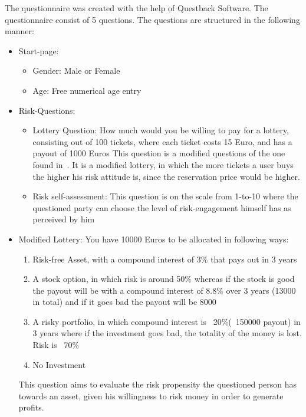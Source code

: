 \documentclass[12pt]{article}
\begin{document}
The questionnaire was created with the help of Questback Software. The questionnaire consist of 5 questions. The questions are structured in the following manner:
\begin{itemize}
    \item Start-page:
        \begin{itemize}
            \item Gender: Male or Female
            \item Age: Free numerical age entry
        \end{itemize}
    \item Risk-Questions:
        \begin{itemize}
            \item Lottery Question: How much would you be willing to pay for a lottery, consisting out of 100 tickets, where each ticket costs 15 Euro, and has a payout of 1000 Euros
                This question is a modified questions of the one found in~\cite{10.1.1.558.6537.pdf}. It is a modified lottery, in which the more tickets a user buys the higher his risk attitude is, since the reservation price would be higher.
            \item Risk self-assessment: This question is on the scale from 1-to-10 where the questioned party can choose the level of risk-engagement himself has as perceived by him
        \end{itemize}
    \item Modified Lottery: You have 10000 Euros to be allocated in following ways:
        \begin{enumerate}
            \item Risk-free Asset, with a compound interest of 3\% that pays out in 3 years
            \item A stock option, in which risk is around 50\% whereas if the stock is good the payout will be with a compound interest of 8.8\% over 3 years (13000 in total) and if it goes bad the payout will be 8000 
            \item A risky portfolio, in which compound interest is ~20\%(~150000 payout) in 3 years where if the investment goes bad, the totality of the money is lost. Risk is ~70\%
            \item No Investment
        \end{enumerate}
        This question aims to evaluate the risk propensity the questioned person has towards an asset, given his willingness to risk money in order to generate profits.
\end{itemize}
\end{document}
